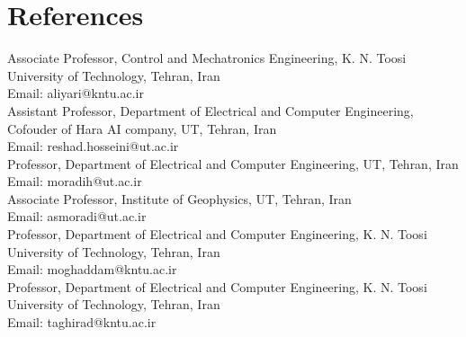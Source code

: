 \section{References}
  \vspace{2pt}
  \resumeSubHeadingListStart
    \small{\item{

        \textbf{}{ Associate Professor, Control and Mechatronics Engineering, K. N. Toosi University of Technology, Tehran, Iran\\Email: aliyari@kntu.ac.ir}\\ \vspace{3pt}
        \textbf{}{ Assistant Professor, Department of Electrical and Computer Engineering, Cofouder of Hara AI company, UT, Tehran, Iran\\Email: reshad.hosseini@ut.ac.ir}\\ \vspace{3pt}
        \textbf{}{ Professor, Department of Electrical and Computer Engineering, UT, Tehran, Iran\\Email: moradih@ut.ac.ir}\\ \vspace{3pt}
        \textbf{}{ Associate Professor, Institute of Geophysics, UT, Tehran, Iran\\Email: asmoradi@ut.ac.ir}\\ \vspace{3pt}
        \textbf{}{ Professor, Department of Electrical and Computer Engineering, K. N. Toosi University of Technology, Tehran, Iran\\Email: moghaddam@kntu.ac.ir}\\ \vspace{3pt}
        \textbf{}{ Professor, Department of Electrical and Computer Engineering, K. N. Toosi University of Technology, Tehran, Iran\\Email: taghirad@kntu.ac.ir}\\ \vspace{3pt}

}}
\resumeSubHeadingListEnd
